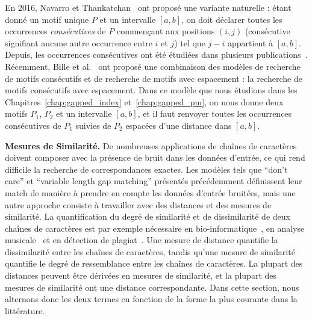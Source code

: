 En 2016, Navarro et Thankatchan~\cite{NAVARRO2016108} ont proposé une variante naturelle : étant donné un motif unique $P$ et un intervalle $[a,b]$, on doit déclarer toutes les occurrences \emph{consécutives} de $P$ commençant aux positions $(i,j)$ (consécutive signifiant aucune autre occurrence entre $i$ et $j$) tel que $j-i$ appartient à $[a,b]$. Depuis, les occurrences consécutives ont été étudiées dans plusieurs publications~\cite{DBLP:conf/fsttcs/BilleGPRS20,DBLP:journals/corr/abs-2304-00887,DBLP:journals/corr/abs-2211-16860}.
Récemment, Bille et al.~\cite{bille2022gapped} ont proposé une combinaison des modèles de recherche de motifs consécutifs et de recherche de motifs avec espacement : la recherche de motifs consécutifs avec espacement.
Dans ce modèle que nous étudions dans les Chapitres~\ref*{chap:gapped_index} et~\ref*{chap:gapped_pm}, on nous donne deux motifs $P_1$, $P_2$ et un intervalle $[a, b]$, et il faut renvoyer toutes les occurrences consécutives de $P_1$ suivies de $P_2$ espacées d'une distance dans $[a, b]$. 



\noindent\textbf{Mesures de Similarité.} 
De nombreuses applications de chaînes de caractères doivent composer avec la présence de bruit dans les données d'entrée, ce qui rend difficile la recherche de correspondances exactes. Les modèles tels que ``don't care'' et ``variable length gap matching'' présentés précédemment définissent leur match de manière à prendre en compte les données d'entrée bruitées, mais une autre approche consiste à travailler avec des distances et des mesures de similarité. La quantification du degré de similarité et de dissimilarité de deux chaînes de caractères est par exemple nécessaire en bio-informatique~\cite{Gusfield1997}, en analyse musicale~\cite{Mongeau1990} et en détection de plagiat~\cite{lukashenko2007computer}. 
%
Une mesure de distance quantifie la dissimilarité entre les chaînes de caractères, tandis qu'une mesure de similarité quantifie le degré de ressemblance entre les chaînes de caractères. La plupart des distances peuvent être dérivées en mesures de similarité, et la plupart des mesures de similarité ont une distance correspondante. Dans cette section, nous alternons donc les deux termes en fonction de la forme la plus courante dans la littérature.

